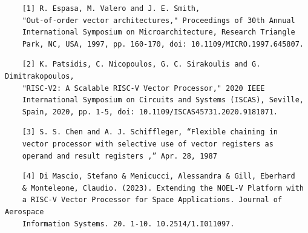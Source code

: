 \documentclass[12pt]{article}
\begin{document}
    \begin{verbatim}
    [1] R. Espasa, M. Valero and J. E. Smith, 
    "Out-of-order vector architectures," Proceedings of 30th Annual 
    International Symposium on Microarchitecture, Research Triangle 
    Park, NC, USA, 1997, pp. 160-170, doi: 10.1109/MICRO.1997.645807.
    \end{verbatim}
    \begin{verbatim}
    [2] K. Patsidis, C. Nicopoulos, G. C. Sirakoulis and G. Dimitrakopoulos, 
    "RISC-V2: A Scalable RISC-V Vector Processor," 2020 IEEE 
    International Symposium on Circuits and Systems (ISCAS), Seville, 
    Spain, 2020, pp. 1-5, doi: 10.1109/ISCAS45731.2020.9181071.
    \end{verbatim}
    \begin{verbatim}
    [3] S. S. Chen and A. J. Schiffleger, “Flexible chaining in 
    vector processor with selective use of vector registers as 
    operand and result registers ,” Apr. 28, 1987
    \end{verbatim}
    \begin{verbatim}
    [4] Di Mascio, Stefano & Menicucci, Alessandra & Gill, Eberhard 
    & Monteleone, Claudio. (2023). Extending the NOEL-V Platform with 
    a RISC-V Vector Processor for Space Applications. Journal of Aerospace 
    Information Systems. 20. 1-10. 10.2514/1.I011097. 
    \end{verbatim}
\end{document}
